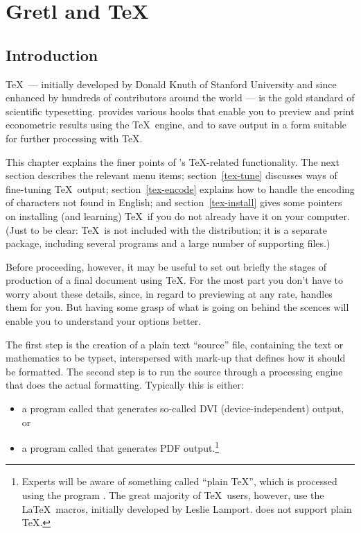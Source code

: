 \chapter{Gretl and \TeX}
\label{gretltex}


\section{Introduction}
\label{tex-intro}

\TeX\ --- initially developed by Donald Knuth of Stanford University
and since enhanced by hundreds of contributors around the world --- is
the gold standard of scientific typesetting.   provides
various hooks that enable you to preview and print econometric results
using the \TeX\ engine, and to save output in a form suitable for
further processing with \TeX.

This chapter explains the finer points of 's \TeX-related
functionality.  The next section describes the relevant menu items;
section~\ref{tex-tune} discusses ways of fine-tuning \TeX\ output;
section~\ref{tex-encode} explains how to handle the encoding of
characters not found in English; and section~\ref{tex-install} gives
some pointers on installing (and learning) \TeX\ if you do not already
have it on your computer.  (Just to be clear: \TeX\ is not included
with the  distribution; it is a separate package, including
several programs and a large number of supporting files.)

Before proceeding, however, it may be useful to set out briefly the
stages of production of a final document using \TeX.  For the most
part you don't have to worry about these details, since, in regard to
previewing at any rate,  handles them for you.  But having
some grasp of what is going on behind the scences will enable you to
understand your options better.

The first step is the creation of a plain text ``source'' file,
containing the text or mathematics to be typset, interspersed with
mark-up that defines how it should be formatted.  The second step is
to run the source through a processing engine that does the actual
formatting.  Typically this is either:
\begin{itemize}
\item a program called  that generates so-called DVI
  (device-independent) output, or
\item a program called  that generates PDF
  output.\footnote{Experts will be aware of something called ``plain
    \TeX'', which is processed using the program .  The great
    majority of \TeX\ users, however, use the \LaTeX\ macros,
    initially developed by Leslie Lamport.   does not
    support plain \TeX.}
\end{itemize}

